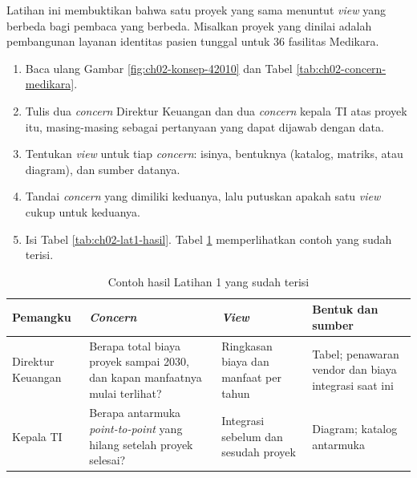 Latihan ini membuktikan bahwa satu proyek yang sama menuntut \textit{view}
yang berbeda bagi pembaca yang berbeda. Misalkan proyek yang dinilai adalah
pembangunan layanan identitas pasien tunggal untuk 36 fasilitas Medikara.

\begin{enumerate}
  \item Baca ulang Gambar \ref{fig:ch02-konsep-42010} dan
        Tabel \ref{tab:ch02-concern-medikara}.
  \item Tulis dua \textit{concern} Direktur Keuangan dan dua \textit{concern}
        kepala TI atas proyek itu, masing-masing sebagai pertanyaan yang
        dapat dijawab dengan data.
  \item Tentukan \textit{view} untuk tiap \textit{concern}: isinya, bentuknya
        (katalog, matriks, atau diagram), dan sumber datanya.
  \item Tandai \textit{concern} yang dimiliki keduanya, lalu putuskan apakah
        satu \textit{view} cukup untuk keduanya.
  \item Isi Tabel \ref{tab:ch02-lat1-hasil}. Tabel \ref{tab:ch02-lat1-contoh}
        memperlihatkan contoh yang sudah terisi.
\end{enumerate}

\begin{table}[!htb]
  \centering
  \caption{Contoh hasil Latihan 1 yang sudah terisi}
  \label{tab:ch02-lat1-contoh}
  {\footnotesize
  \begin{tabularx}{\textwidth}{>{\raggedright\arraybackslash}p{2.0cm}
                               >{\raggedright\arraybackslash}X
                               >{\raggedright\arraybackslash}p{2.8cm}
                               >{\raggedright\arraybackslash}p{2.8cm}}
    \hline
    \textbf{Pemangku} & \textbf{\textit{Concern}} & \textbf{\textit{View}} & \textbf{Bentuk dan sumber} \\
    \hline
    Direktur Keuangan & Berapa total biaya proyek sampai 2030, dan kapan manfaatnya mulai terlihat? & Ringkasan biaya dan manfaat per tahun & Tabel; penawaran vendor dan biaya integrasi saat ini \\
    \hline
    Kepala TI & Berapa antarmuka \textit{point-to-point} yang hilang setelah proyek selesai? & Integrasi sebelum dan sesudah proyek & Diagram; katalog antarmuka \\
    \hline
  \end{tabularx}}
\end{table}


